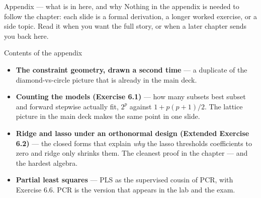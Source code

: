 \documentclass[aspectratio=169,11pt]{beamer}
\begin{document}
\begin{frame}{Appendix --- what is in here, and why}
  \small
  Nothing in the appendix is needed to follow the chapter: each slide is a
  formal derivation, a longer worked exercise, or a side topic. Read it when
  you want the full story, or when a later chapter sends you back here.
  \begin{block}{Contents of the appendix}
    \begin{itemize}
      \item \textbf{The constraint geometry, drawn a second time} --- a duplicate of the diamond-vs-circle picture that is already in the main deck.
      \item \textbf{Counting the models (Exercise 6.1)} --- how many subsets best subset and forward stepwise actually fit, $2^p$ against $1+p(p+1)/2$. The lattice picture in the main deck makes the same point in one slide.
      \item \textbf{Ridge and lasso under an orthonormal design (Extended Exercise 6.2)} --- the closed forms that explain \emph{why} the lasso thresholds coefficients to zero and ridge only shrinks them. The cleanest proof in the chapter --- and the hardest algebra.
      \item \textbf{Partial least squares} --- PLS as the supervised cousin of PCR, with Exercise 6.6. PCR is the version that appears in the lab and the exam.
    \end{itemize}
  \end{block}
\end{frame}
\end{document}
